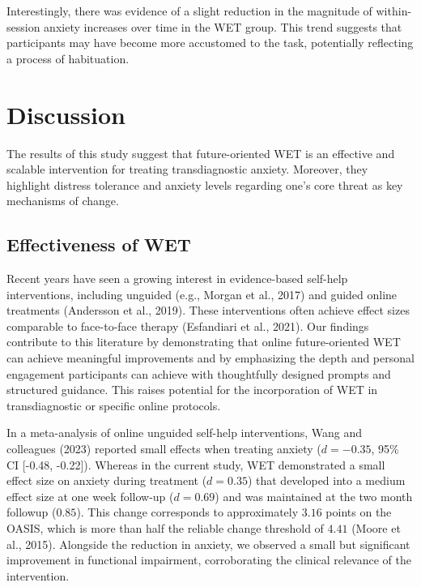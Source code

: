 \documentclass[
  man,floatsintext]{apa7}
\begin{document}
Interestingly, there was evidence of a slight reduction in the magnitude of within-session anxiety increases over time in the WET group.
This trend suggests that participants may have become more accustomed to the task, potentially reflecting a process of habituation.

\section{Discussion}\label{discussion}

The results of this study suggest that future-oriented WET is an effective and scalable intervention for treating transdiagnostic anxiety.
Moreover, they highlight distress tolerance and anxiety levels regarding one's core threat as key mechanisms of change.

\subsection{Effectiveness of WET}\label{effectiveness-of-wet}

Recent years have seen a growing interest in evidence-based self-help interventions, including unguided (e.g., Morgan et al., 2017) and guided online treatments (Andersson et al., 2019).
These interventions often achieve effect sizes comparable to face-to-face therapy (Esfandiari et al., 2021).
Our findings contribute to this literature by demonstrating that online future-oriented WET can achieve meaningful improvements and by emphasizing the depth and personal engagement participants can achieve with thoughtfully designed prompts and structured guidance.
This raises potential for the incorporation of WET in transdiagnostic or specific online protocols.

In a meta-analysis of online unguided self-help interventions, Wang and colleagues (2023)
reported small effects when treating anxiety (\(d = -0.35\), 95\% CI {[}-0.48, -0.22{]}).
Whereas in the current study, WET demonstrated a small effect size on anxiety during treatment (\(d = 0.35\)) that developed into a medium effect size at one week follow-up (\(d = 0.69\)) and was maintained at the two month followup (\(0.85\)).
This change corresponds to approximately \(3.16\) points on the OASIS, which is more than half the reliable change threshold of \(4.41\) (Moore et al., 2015).
Alongside the reduction in anxiety, we observed a small but significant improvement in functional impairment, corroborating the clinical relevance of the intervention.
\end{document}
